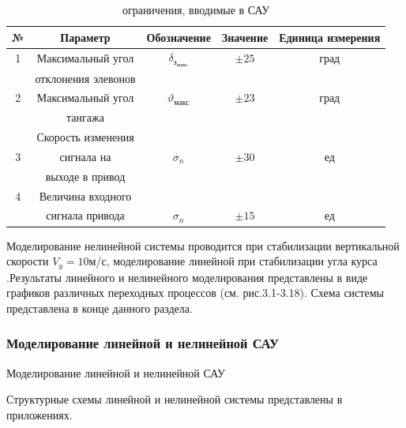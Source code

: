 \begin{table}[H]
    \centering
    \caption{ограничения, вводимые в САУ}
    \begin{tabular}{|c|c|c|c|c|}
    \hline
        № & Параметр & Обозначение & Значение & Единица измерения \\ \hline
        1 & Максимальный угол & $\delta_\text{э}_\text{макс}$ & $\pm 25$ & град \\ 
         & отклонения элевонов &  &  & \\ \hline
        2 & Максимальный угол & $\vartheta_\text{макс}$ & $\pm 23$ & град\\
         & тангажа &  &  & \\ \hline
         & Скорость изменения &  &  & \\ 
        3 & сигнала на & $\dot{\sigma_n}$ & $\pm 30$ &ед \\ 
        & выходе в привод &  &  & \\ \hline
        4 & Величина входного &  &  & \\ 
         & сигнала привода & $\sigma_n$ & $\pm 15$ &ед \\ \hline
    \end{tabular}
    \label{tab:Нелинейности}
\end{table}

Моделирование нелинейной системы проводится при стабилизации вертикальной скорости $V_y = 10$м/с, моделирование линейной при стабилизации угла курса  .Результаты линейного и нелинейного моделирования представлены в виде графиков различных переходных процессов (см. рис.3.1-3.18). Схема системы представлена в конце данного раздела.

\begin{center}
    \subsubsection{Моделирование линейной и нелинейной САУ}Моделирование линейной и нелинейной САУ
\end{center}

Структурные схемы линейной и нелинейной системы представлены в приложениях.

